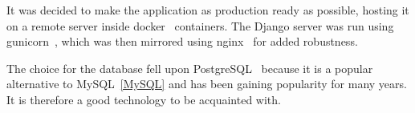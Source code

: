 It was decided to make the application as production ready as possible,
hosting it on a remote server inside docker~\cite{docker} containers. The
Django server was run using gunicorn~\cite{gunicorn}, which was then
mirrored using nginx~\cite{nginx} for added robustness.

The choice for the database fell upon PostgreSQL~\cite{postgres} because it
is a popular alternative to MySQL~\ref{MySQL} and has been gaining popularity
for many years. It is therefore a good technology to be acquainted with.
